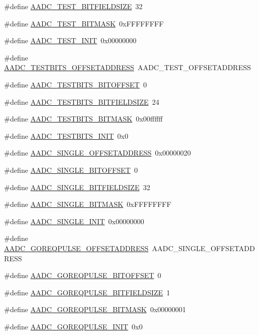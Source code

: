 \begin{DoxyCompactItemize}
\item 
\#define \hyperlink{a00543_ac3ee7603ceb942ae71c171fd4c00af2a}{AADC\_\-TEST\_\-BITFIELDSIZE}~32
\item 
\#define \hyperlink{a00543_a3797d4c731638648c17a51cbc61609b3}{AADC\_\-TEST\_\-BITMASK}~0xFFFFFFFF
\item 
\#define \hyperlink{a00543_af7d03003881636ffa6c9e88731f0b4bb}{AADC\_\-TEST\_\-INIT}~0x00000000
\item 
\#define \hyperlink{a00543_aaff971f93d6718ee2a9407fdf2d0dc6d}{AADC\_\-TESTBITS\_\-OFFSETADDRESS}~AADC\_\-TEST\_\-OFFSETADDRESS
\item 
\#define \hyperlink{a00543_aa58224d6d22e1317fdf907a46c04b160}{AADC\_\-TESTBITS\_\-BITOFFSET}~0
\item 
\#define \hyperlink{a00543_a4fefec84f798f38b6bc74d100460a0f5}{AADC\_\-TESTBITS\_\-BITFIELDSIZE}~24
\item 
\#define \hyperlink{a00543_a4c061c978799be60e8115cc81c689770}{AADC\_\-TESTBITS\_\-BITMASK}~0x00ffffff
\item 
\#define \hyperlink{a00543_a9c5163e406be424ebd203bd972d18d76}{AADC\_\-TESTBITS\_\-INIT}~0x0
\item 
\#define \hyperlink{a00543_a4bcc96b128ebb0f092d82daf50a0580d}{AADC\_\-SINGLE\_\-OFFSETADDRESS}~0x00000020
\item 
\#define \hyperlink{a00543_a470aec6bca04f32f6a4ba56c6c9805c8}{AADC\_\-SINGLE\_\-BITOFFSET}~0
\item 
\#define \hyperlink{a00543_a2af571c474315ea3a177f4d8056c45e6}{AADC\_\-SINGLE\_\-BITFIELDSIZE}~32
\item 
\#define \hyperlink{a00543_ae455894f9406636e4f9334b9be4a6ed4}{AADC\_\-SINGLE\_\-BITMASK}~0xFFFFFFFF
\item 
\#define \hyperlink{a00543_a433a8c7136eeaa2fa9bf8aa2b06bb4f5}{AADC\_\-SINGLE\_\-INIT}~0x00000000
\item 
\#define \hyperlink{a00543_a8f4ee84591f75edabfd25de2b88ce71a}{AADC\_\-GOREQPULSE\_\-OFFSETADDRESS}~AADC\_\-SINGLE\_\-OFFSETADDRESS
\item 
\#define \hyperlink{a00543_a46d0bdbee27c25407676a784fd7936ab}{AADC\_\-GOREQPULSE\_\-BITOFFSET}~0
\item 
\#define \hyperlink{a00543_abd5f67b9ecbc234c7dccd3c92dd28ebe}{AADC\_\-GOREQPULSE\_\-BITFIELDSIZE}~1
\item 
\#define \hyperlink{a00543_ae59dd92f70612ff29ac3b0805a7a0050}{AADC\_\-GOREQPULSE\_\-BITMASK}~0x00000001
\item 
\#define \hyperlink{a00543_a3fe5b4d8304abaaf21c02a3e29f57f12}{AADC\_\-GOREQPULSE\_\-INIT}~0x0

\end{DoxyCompactItemize}
